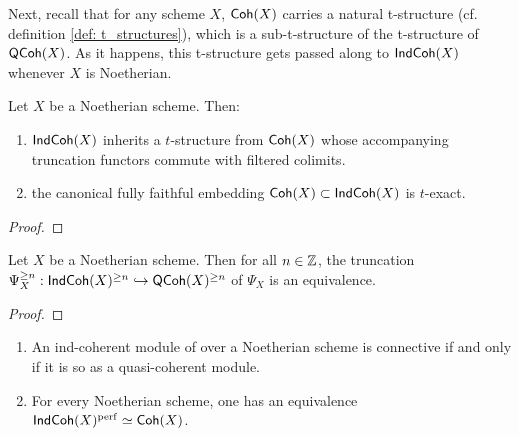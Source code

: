                     Next, recall that for any scheme $X$, $\mathsf{Coh}(X)$ carries a natural t-structure (cf. definition \ref{def: t_structures}), which is a sub-t-structure of the t-structure of $\mathsf{QCoh}(X)$. As it happens, this t-structure gets passed along to $\mathsf{Ind}\mathsf{Coh}(X)$ whenever $X$ is Noetherian.
                    \begin{lemma} \label{lemma: t_structure_of_ind_coherent_sheaves}
                        Let $X$ be a Noetherian scheme. Then:
                            \begin{enumerate}
                                \item $\mathsf{Ind}\mathsf{Coh}(X)$ inherits a $t$-structure from $\mathsf{Coh}(X)$ whose accompanying truncation functors commute with filtered colimits. 
                                \item the canonical fully faithful embedding $\mathsf{Coh}(X) \subset \mathsf{Ind}\mathsf{Coh}(X)$ is $t$-exact.
                            \end{enumerate}
                    \end{lemma}
                        \begin{proof}
                                        
                        \end{proof}
                    \begin{proposition} \label{prop: truncations_of_ind_coherent_sheaves}
                        Let $X$ be a Noetherian scheme. Then for all $n \in \mathbb{Z}$, the truncation $\Psi_X^{\geq n}: \mathsf{Ind}\mathsf{Coh}(X)^{\geq n} \hookrightarrow \mathsf{QCoh}(X)^{\geq n}$ of $\Psi_X$ is an equivalence.
                    \end{proposition}
                        \begin{proof}
                                        
                        \end{proof}
                    \begin{corollary} \label{coro: connectivity_of_ind_coherent_sheaves}
                        \noindent
                        \begin{enumerate}
                            \item An ind-coherent module of over a Noetherian scheme is connective if and only if it is so as a quasi-coherent module.
                            \item For every Noetherian scheme, one has an equivalence $\mathsf{Ind}\mathsf{Coh}(X)^{\mathrm{perf}} \simeq \mathsf{Coh}(X)$.
                        \end{enumerate}
                    \end{corollary}
                    

